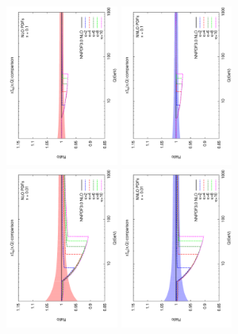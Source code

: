 \documentclass[letter,11pt]{article}
\begin{document}
%
%
\begin{figure}[h]
\centering
\includegraphics[width=0.33\textwidth,angle=-90]{./singletb_ratio_kb_nlo_x_01.pdf}
\includegraphics[width=0.33\textwidth,angle=-90]{./singletb_ratio_kb_nnlo_x_01.pdf}
\includegraphics[width=0.33\textwidth,angle=-90]{./singletb_ratio_kb_nlo_x_001.pdf}
\includegraphics[width=0.33\textwidth,angle=-90]{./singletb_ratio_kb_nnlo_x_001.pdf}

\end{figure}
\end{document}
